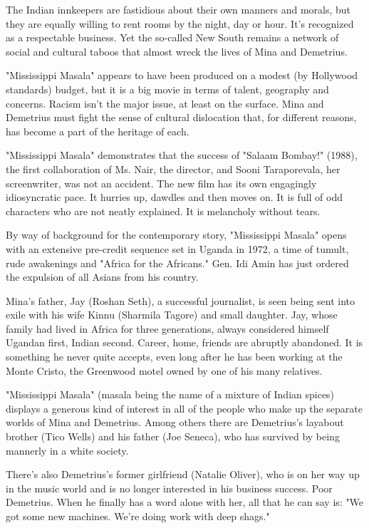 The Indian innkeepers are fastidious about their own manners and morals,
but they are equally willing to rent rooms by the night, day or hour.
It's recognized as a respectable business. Yet the so-called New South
remains a network of social and cultural taboos that almost wreck the
lives of Mina and Demetrius.

"Mississippi Masala" appears to have been produced on a modest (by
Hollywood standards) budget, but it is a big movie in terms of talent,
geography and concerns. Racism isn't the major issue, at least on the
surface. Mina and Demetrius must fight the sense of cultural dislocation
that, for different reasons, has become a part of the heritage of each.

"Mississippi Masala" demonstrates that the success of "Salaam Bombay!"
(1988), the first collaboration of Ms. Nair, the director, and Sooni
Taraporevala, her screenwriter, was not an accident. The new film has
its own engagingly idiosyncratic pace. It hurries up, dawdles and then
moves on. It is full of odd characters who are not neatly explained. It
is melancholy without tears.

By way of background for the contemporary story, "Mississippi Masala"
opens with an extensive pre-credit sequence set in Uganda in 1972, a
time of tumult, rude awakenings and "Africa for the Africans." Gen. Idi
Amin has just ordered the expulsion of all Asians from his country.

Mina's father, Jay (Roshan Seth), a successful journalist, is seen being
sent into exile with his wife Kinnu (Sharmila Tagore) and small
daughter. Jay, whose family had lived in Africa for three generations,
always considered himself Ugandan first, Indian second. Career, home,
friends are abruptly abandoned. It is something he never quite accepts,
even long after he has been working at the Monte Cristo, the Greenwood
motel owned by one of his many relatives.

"Mississippi Masala" (masala being the name of a mixture of Indian
spices) displays a generous kind of interest in all of the people who
make up the separate worlds of Mina and Demetrius. Among others there
are Demetrius's layabout brother (Tico Wells) and his father (Joe
Seneca), who has survived by being mannerly in a white society.

There's also Demetrius's former girlfriend (Natalie Oliver), who is on
her way up in the music world and is no longer interested in his
business success. Poor Demetrius. When he finally has a word alone with
her, all that he can say is: "We got some new machines. We're doing work
with deep shags."

